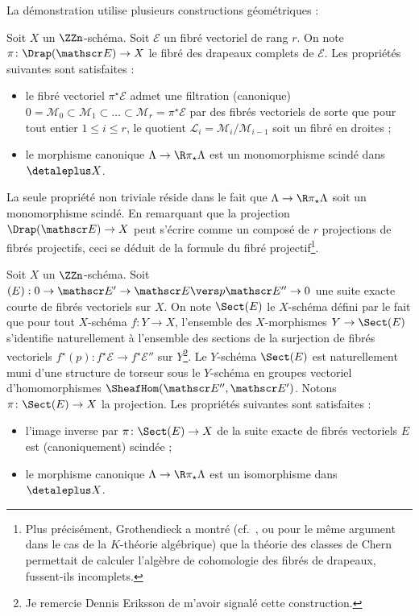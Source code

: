 \documentclass[10pt]{../fichiers-configuration-latex/smfart}
\begin{document}
La démonstration utilise plusieurs constructions géométriques :

\begin{proposition}\label{16-proposition-scindage-1}
Soit $X$ un $\ZZn$-schéma. Soit $\mathscr E$ un 
fibré vectoriel de rang $r$. On note
$\pi\colon \Drap(\mathscr E)\to X$ le fibré des drapeaux complets de
$\mathscr E$. Les
propriétés suivantes sont satisfaites :
\begin{itemize}
\item le fibré vectoriel $\pi^\star \mathscr E$ admet une filtration (canonique)
$0=\mathscr M_0\subset \mathscr M_1\subset \dots\subset \mathscr M_r=
\pi^\star \mathscr E$ par des fibrés
vectoriels de sorte que pour tout entier $1\leq i\leq r$, le quotient
$\mathscr L_i=\mathscr M_i/\mathscr M_{i-1}$ soit un fibré en droites ;
\item le morphisme canonique $\Lambda\to \R\pi_\star\Lambda$ est un
monomorphisme scindé dans $\detaleplus X$.
\end{itemize}
\end{proposition}

La seule propriété non triviale réside dans le fait que $\Lambda
\to\R\pi_\star\Lambda$ soit un monomorphisme scindé. En remarquant
que la projection $\Drap(\mathscr E)\to X$ peut s'écrire comme un composé
de $r$ projections de fibrés projectifs, ceci se déduit de la formule du
fibré projectif\;\footnote{Plus précisément, Grothendieck a montré
(cf.~\cite{PFTI@Grothendieck}, ou  pour le même argument
dans le cas de la $K$-théorie algébrique) que la théorie des classes de
Chern permettait de calculer l'algèbre de cohomologie des fibrés de
drapeaux, fussent-ils incomplets.}.

\begin{proposition}\label{16-proposition-scindage-2}
Soit $X$ un $\ZZn$-schéma. Soit $(E):0\to \mathscr E' \to \mathscr E \vers p 
\mathscr E''\to 0$
une suite exacte courte de fibrés vectoriels sur $X$. On note $\Sect(E)$
le $X$-schéma défini par le fait que pour tout $X$-schéma $f\colon Y\to
X$, l'ensemble des $X$-morphismes $Y\to \Sect(E)$ s'identifie
naturellement à l'ensemble des sections de la surjection de fibrés
vectoriels 
$f^\star(p)\colon f^\star \mathscr E\to f^\star \mathscr E''$ sur
$Y$\;\footnote{Je remercie Dennis Eriksson de m'avoir signalé cette
construction.}.
Le $Y$-schéma $\Sect(E)$ est naturellement muni d'une structure de 
torseur 
sous le $Y$-schéma en groupes vectoriel d'homomorphismes 
$\SheafHom(\mathscr E'',\mathscr E')$.
Notons $\pi\colon \Sect(E)\to X$ la projection. Les propriétés
suivantes sont satisfaites :
\begin{itemize}
\item l'image inverse par $\pi\colon \Sect(E)\to X$
de la suite exacte de fibrés vectoriels
$E$ est (canoniquement) scindée ;
\item le morphisme canonique $\Lambda\to \R\pi_\star\Lambda$
est un isomorphisme dans $\detaleplus X$.
\end{itemize}
\end{proposition}
\end{document}
